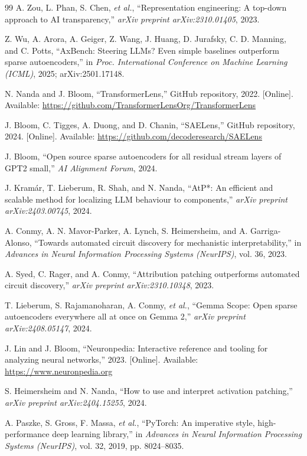 \documentclass[12pt,a4paper]{report}
\begin{document}
\begin{thebibliography}{99}
 A. Zou, L. Phan, S. Chen, \textit{et al.}, ``Representation engineering: A top-down approach to AI transparency,'' \textit{arXiv preprint arXiv:2310.01405}, 2023.

 Z. Wu, A. Arora, A. Geiger, Z. Wang, J. Huang, D. Jurafsky, C. D. Manning, and C. Potts, ``AxBench: Steering LLMs? Even simple baselines outperform sparse autoencoders,'' in \textit{Proc. International Conference on Machine Learning (ICML)}, 2025; arXiv:2501.17148.

 N. Nanda and J. Bloom, ``TransformerLens,'' GitHub repository, 2022. [Online]. Available: \url{https://github.com/TransformerLensOrg/TransformerLens}

 J. Bloom, C. Tigges, A. Duong, and D. Chanin, ``SAELens,'' GitHub repository, 2024. [Online]. Available: \url{https://github.com/decoderesearch/SAELens}

 J. Bloom, ``Open source sparse autoencoders for all residual stream layers of GPT2 small,'' \textit{AI Alignment Forum}, 2024.

 J. Kram\'ar, T. Lieberum, R. Shah, and N. Nanda, ``AtP*: An efficient and scalable method for localizing LLM behaviour to components,'' \textit{arXiv preprint arXiv:2403.00745}, 2024.

 A. Conmy, A. N. Mavor-Parker, A. Lynch, S. Heimersheim, and A. Garriga-Alonso, ``Towards automated circuit discovery for mechanistic interpretability,'' in \textit{Advances in Neural Information Processing Systems (NeurIPS)}, vol. 36, 2023.

 A. Syed, C. Rager, and A. Conmy, ``Attribution patching outperforms automated circuit discovery,'' \textit{arXiv preprint arXiv:2310.10348}, 2023.

 T. Lieberum, S. Rajamanoharan, A. Conmy, \textit{et al.}, ``Gemma Scope: Open sparse autoencoders everywhere all at once on Gemma 2,'' \textit{arXiv preprint arXiv:2408.05147}, 2024.

 J. Lin and J. Bloom, ``Neuronpedia: Interactive reference and tooling for analyzing neural networks,'' 2023. [Online]. Available: \url{https://www.neuronpedia.org}

 S. Heimersheim and N. Nanda, ``How to use and interpret activation patching,'' \textit{arXiv preprint arXiv:2404.15255}, 2024.

 A. Paszke, S. Gross, F. Massa, \textit{et al.}, ``PyTorch: An imperative style, high-performance deep learning library,'' in \textit{Advances in Neural Information Processing Systems (NeurIPS)}, vol. 32, 2019, pp. 8024--8035.


\end{thebibliography}
\end{document}
